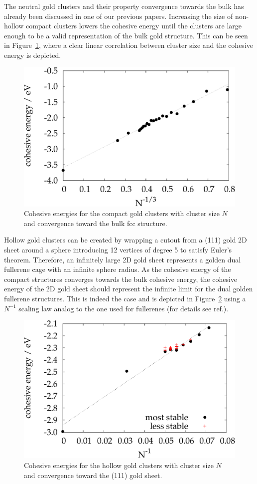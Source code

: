 The neutral gold clusters and their property convergence towards the bulk has
already been discussed in one of our previous papers.\autocite{Assadollahzadeh_systematicsearchminimum_2009}
Increasing the size of non-hollow compact clusters lowers the cohesive energy until the
clusters are large enough to be a valid representation of the bulk gold structure.
This can be seen in Figure~\ref{fig:cohesiveenergies1}, where a clear linear
correlation between cluster size and the cohesive energy is depicted.

\begin{figure}\centering
	\includegraphics[width=.8\textwidth]{golddual/cohesive.pdf}
	\caption{Cohesive energies for the compact gold clusters with cluster size $N$ and convergence toward the bulk fcc structure.}
	\label{fig:cohesiveenergies1}
\end{figure}

Hollow gold clusters can be created by wrapping a cutout from a (111) gold 2D sheet
around a sphere introducing 12 vertices of degree 5 to satisfy Euler's theorem. 
Therefore, an infinitely large 2D gold sheet represents a
golden dual fullerene cage with an infinite sphere radius. As the cohesive energy
of the compact structures converges towards the bulk cohesive energy,
the cohesive energy of the 2D gold sheet should represent the infinite limit for the dual
golden fullerene structures. This is indeed the case and is depicted in Figure~\ref{fig:cohesiveenergies2}
using a $N^{-1}$ scaling law analog to the one used for fullerenes (for details see ref.\autocite{Wirz_smallfullerenesgraphene_2015}). 

\begin{figure}\centering
	\includegraphics[width=.8\textwidth]{golddual/cohesive2.pdf}
	\caption{Cohesive energies for the hollow gold clusters with cluster size $N$ and convergence toward the (111) gold sheet.}
	\label{fig:cohesiveenergies2}
\end{figure}

